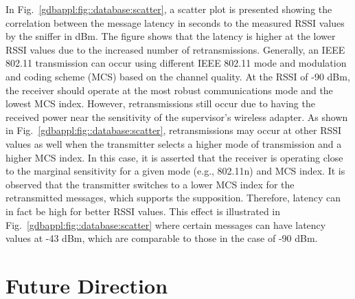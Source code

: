 In Fig.~\ref{gdbappl:fig::database:scatter}, a scatter plot is presented showing the correlation between the message latency in seconds to the measured RSSI values by the sniffer in dBm.  The figure shows that the latency is higher at the lower RSSI values due to the increased number of retransmissions. Generally, an IEEE 802.11 transmission can occur using different IEEE 802.11 mode and modulation and coding scheme (MCS) based on the channel quality. At the RSSI of -90 dBm, the receiver should operate at the most robust communications mode and the lowest MCS index. However, retransmissions still occur due to having the received power near the sensitivity of the supervisor's wireless adapter. As shown in Fig.~\ref{gdbappl:fig::database:scatter}, retransmissions may occur at other RSSI values as well when the transmitter selects a higher mode of transmission and a higher MCS index. In this case, it is asserted that the receiver is operating close to the marginal sensitivity for a given mode (e.g., 802.11n) and MCS index.  It is observed that the transmitter switches to a lower MCS index for the retransmitted messages, which supports the supposition. Therefore, latency can in fact be high for better RSSI values.  This effect is illustrated in Fig.~\ref{gdbappl:fig::database:scatter} where certain messages can have latency values at -43 dBm, which are comparable to those in the case of  -90 dBm.  





\section{Future Direction}

